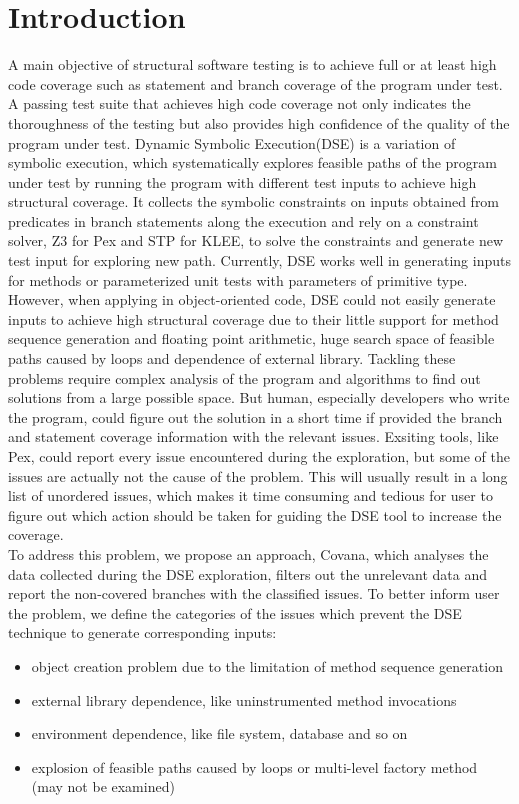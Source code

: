 \section{Introduction}
A main objective of structural software testing is to achieve full or at least high code coverage such as statement and branch coverage of the program under test. A passing test suite that achieves high code coverage not only indicates the thoroughness of the testing but also provides high confidence of the quality of the program under test. Dynamic Symbolic Execution(DSE)\cite{CadarGPDE06,GodefroidKS05,SenMA05} is a variation of symbolic execution, which systematically explores feasible paths of the program under test by running the program with different test inputs to achieve high structural coverage. It collects the symbolic constraints on inputs obtained from predicates in branch statements along the execution and rely on a constraint solver, Z3 for Pex\cite{TillmannH08} and STP\cite{stp} for KLEE\cite{klee}, to solve the constraints and generate new test input for exploring new path. Currently, DSE works well in generating inputs for methods or parameterized unit tests with parameters of primitive type. However, when applying in object-oriented code, DSE could not easily generate inputs to achieve high structural coverage due to their little support for method sequence generation and floating point arithmetic, huge search space of feasible paths caused by loops and dependence of external library. Tackling these problems require complex analysis of the program and algorithms to find out solutions from a large possible space. But human, especially developers who write the program, could figure out the solution in a short time if provided the branch and statement coverage information with the relevant issues. Exsiting tools, like Pex, could report every issue encountered during the exploration, but some of the issues are actually not the cause of the problem. This will usually result in a long list of unordered issues, which makes it time consuming and tedious for user to figure out which action should be taken for guiding the DSE tool to increase the coverage.
\\To address this problem, we propose an approach, Covana, which analyses the data collected during the DSE exploration, filters out the unrelevant data and report the non-covered branches with the classified issues. To better inform user the problem, we define the categories of the issues which prevent the DSE technique to generate corresponding inputs:
\begin{itemize}
	\item object creation problem due to the limitation of method sequence generation 
	\item external library dependence, like uninstrumented method invocations
	\item environment dependence, like file system, database and so on
	\item explosion of feasible paths caused by loops or multi-level factory method (may not be examined)
\end{itemize}
